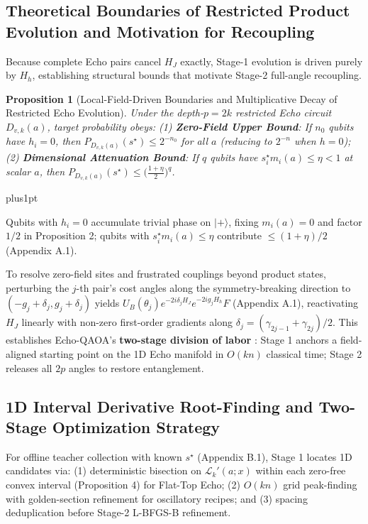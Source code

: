 \documentclass{article}
\makeatletter
\renewenvironment{proof}[1][\proofname]{\par
  \pushQED{\qed}%
  \normalfont \topsep1pt plus1pt\relax
  \trivlist
  \item[\hskip\labelsep
        \itshape
    #1\@addpunct{.}]\ignorespaces
}{%
  \popQED\endtrivlist\@endpefalse
}
\theoremstyle{plain}
\newtheorem{proposition}{Proposition}
\theoremstyle{definition}
\makeatother
\begin{document}
\subsection{Theoretical Boundaries of Restricted Product Evolution and Motivation for Recoupling}\label{subsec:3_7}

Because complete Echo pairs cancel $H_J$ exactly, Stage-1 evolution is driven purely by $H_h$, establishing structural bounds that motivate Stage-2 full-angle recoupling.

\begin{proposition}[Local-Field-Driven Boundaries and Multiplicative Decay of Restricted Echo Evolution]
\label{prop:5}
Under the depth-$p=2k$ restricted Echo circuit $D_{v,k}(a)$, target probability obeys:
(1) \textbf{Zero-Field Upper Bound}: If $n_0$ qubits have $h_i=0$, then $P_{D_{v,k}(a)}(s^\star)\le 2^{-n_0}$ for all $a$ (reducing to $2^{-n}$ when $h=0$);
(2) \textbf{Dimensional Attenuation Bound}: If $q$ qubits have $s_i^\star m_i(a)\le\eta<1$ at scalar $a$, then $P_{D_{v,k}(a)}(s^\star)\le\big(\frac{1+\eta}{2}\big)^q$.
\end{proposition}

\begin{proof}[Proof Sketch]
Qubits with $h_i=0$ accumulate trivial phase on $|+\rangle$, fixing $m_i(a)=0$ and factor $1/2$ in Proposition 2; qubits with $s_i^\star m_i(a)\le\eta$ contribute $\le(1+\eta)/2$ (Appendix A.1).
\end{proof}

To resolve zero-field sites and frustrated couplings beyond product states, perturbing the $j$-th pair's cost angles along the symmetry-breaking direction to $(-g_j+\delta_j, g_j+\delta_j)$ yields $U_B(\theta_j)e^{-2i\delta_j H_J}e^{-2ig_j H_h}F$ (Appendix A.1), reactivating $H_J$ linearly with non-zero first-order gradients along $\delta_j=(\gamma_{2j-1}+\gamma_{2j})/2$. This establishes Echo-QAOA's \textbf{two-stage division of labor} \citep{dupont2022entanglement,wurtz2022counterdiabaticity,yang2017optimizing}: Stage 1 anchors a field-aligned starting point on the 1D Echo manifold in $O(kn)$ classical time; Stage 2 releases all $2p$ angles to restore entanglement.

\subsection{1D Interval Derivative Root-Finding and Two-Stage Optimization Strategy}\label{subsec:3_8}

For offline teacher collection with known $s^\star$ (Appendix B.1), Stage 1 locates 1D candidates via: (1) deterministic bisection on $\mathcal L_k'(a;x)$ within each zero-free convex interval (Proposition 4) for Flat-Top Echo; (2) $O(kn)$ grid peak-finding with golden-section refinement for oscillatory recipes; and (3) spacing deduplication before Stage-2 L-BFGS-B refinement.
\end{document}
